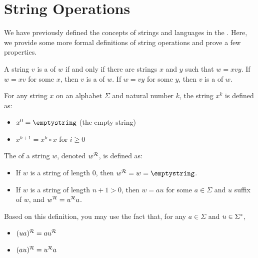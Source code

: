 \section{String Operations}

\begin{discussion}
We have previously defined the concepts of strings and languages in the . Here, we provide some more formal definitions of string operations and prove a few properties.
\end{discussion}

\begin{defn}
A string $v$ is a  of $w$ if and only if there are strings $x$ and $y$ such that $w = xvy$. If $w = xv$ for some $x$, then $v$ is a  of $w$. If $w = vy$ for some $y$, then $v$ is a  of $w$.
\end{defn}

\begin{defn}
For any string $x$ on an alphabet $\Sigma$ and natural number $k$, the string $x^k$ is defined as:
\begin{itemize}
\item $x^0 = \emptystring$ \quad (the empty string)
\item $x^{k+1} = x^k \circ x$ \quad for $i \geq 0$
\end{itemize}
\end{defn}

\begin{defn}
The  of a string $w$, denoted $w^{\mathcal{R}}$, is defined as:
\begin{itemize}
\item If $w$ is a string of length $0$, then $\stringrev{w} = w = \emptystring$.
\item If $w$ is a string of length $n+1 > 0$, then $w = au$ for some $a \in \Sigma$ and $u$ suffix of $w$, and $w^{\mathcal{R}} = u^{\mathcal{R}}a$.
\end{itemize}
Based on this definition, you may use the fact that, for any $a \in \Sigma$ and $u \in \Sigma^{*}$,
\begin{itemize}
\item $(ua)^{\mathcal{R}} = au^{\mathcal{R}}$
\item $(au)^{\mathcal{R}} = u^{\mathcal{R}}a$
\end{itemize}
\end{defn}

